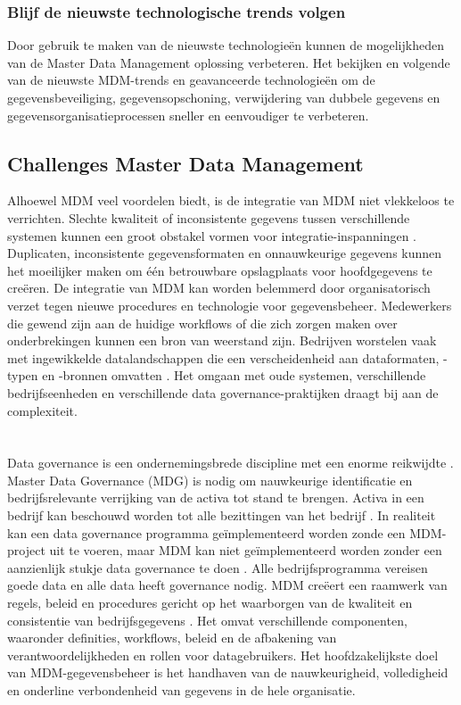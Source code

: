 \subsubsection{Blijf de nieuwste technologische trends volgen }
Door gebruik te maken van de nieuwste technologieën kunnen de mogelijkheden van de Master Data Management oplossing verbeteren. Het bekijken en volgende van de nieuwste MDM-trends en geavanceerde technologieën om de gegevensbeveiliging, gegevensopschoning, verwijdering van dubbele gegevens en gegevensorganisatieprocessen sneller en eenvoudiger te verbeteren.

\subsection{Challenges Master Data Management}
Alhoewel  MDM veel voordelen biedt, is de integratie van MDM niet vlekkeloos te verrichten. Slechte kwaliteit of inconsistente gegevens tussen verschillende systemen kunnen een groot obstakel vormen voor integratie-inspanningen \autocite{Pansara2024}. Duplicaten, inconsistente gegevensformaten en onnauwkeurige gegevens kunnen het moeilijker maken om één betrouwbare opslagplaats voor hoofdgegevens te creëren. De integratie van MDM kan worden belemmerd door organisatorisch verzet tegen nieuwe procedures en technologie voor gegevensbeheer. Medewerkers die gewend zijn aan de huidige workflows of die zich zorgen maken over onderbrekingen kunnen een bron van weerstand zijn. Bedrijven worstelen vaak met ingewikkelde datalandschappen die een verscheidenheid aan dataformaten, -typen en -bronnen omvatten \autocite{Sharma2020}. Het omgaan met oude systemen, verschillende bedrijfseenheden en verschillende data governance-praktijken draagt bij aan de complexiteit.


\section{}%
\label{sec:mdg}
Data governance is een ondernemingsbrede discipline met een enorme reikwijdte \autocite{Cawsey2022}. Master Data Governance (MDG) is nodig om nauwkeurige identificatie en bedrijfsrelevante verrijking van de activa tot stand te brengen. Activa in een bedrijf kan beschouwd worden tot alle bezittingen van het bedrijf \autocite{Informer2023}. 
In realiteit kan een data governance programma geïmplementeerd worden zonde een MDM-project uit te voeren, maar MDM kan niet geïmplementeerd worden zonder een aanzienlijk stukje data governance te doen  \autocite{Collibra2023}. Alle bedrijfsprogramma vereisen goede data en alle data heeft governance nodig. 
MDM creëert een raamwerk van regels, beleid en procedures gericht op het waarborgen van de kwaliteit en consistentie van bedrijfsgegevens \autocite{Shewaramani2023}. Het omvat verschillende componenten, waaronder definities, workflows, beleid en de afbakening van verantwoordelijkheden en rollen voor datagebruikers. Het hoofdzakelijkste doel van  MDM-gegevensbeheer is het handhaven van de nauwkeurigheid, volledigheid en onderline verbondenheid van gegevens in de hele organisatie. 

